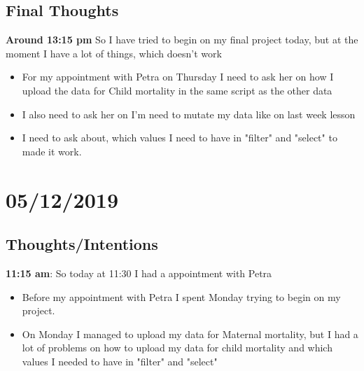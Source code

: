 \documentclass{article}
\begin{document}
\subsection{Final Thoughts}
\textbf{Around 13:15 pm} So I have tried to begin on my final project today, but at the moment I have a lot of things, which doesn't work   
\begin{itemize}
    \item For my appointment with Petra on Thursday I need to ask her on how I upload the data for Child mortality in the same script as the other data 
    \item I also need to ask her on I'm need to mutate my data like on last week lesson
    \item I need to ask about, which values I need to have in "filter" and "select" to made it work. 
\end{itemize}\bigskip


\section{05/12/2019}
\subsection{Thoughts/Intentions}
\textbf{11:15 am}:  So today at 11:30 I had a appointment with Petra
\begin{itemize}
    \item Before my appointment with Petra I spent Monday trying to begin on my project. 
    \item On Monday I managed to upload my data for Maternal mortality, but I had a lot of problems on how to upload my data for child mortality and which values I needed to have in "filter" and "select"
\end{itemize}
\end{document}
